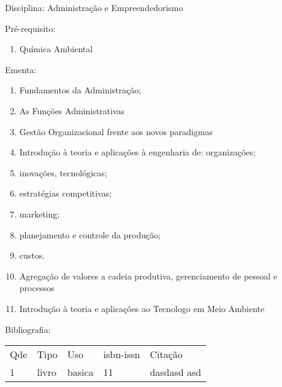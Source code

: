 \documentclass[12pt,a4paper,twoside]{report}
\begin{document}
Disciplina: Administração e Empreendedorismo

Pré-requisito:
\begin{enumerate}
\item Química Ambiental
\end{enumerate}

Ementa:
\begin{enumerate}
\item Fundamentos da Administração;
\item As Funções Administrativas
\item Gestão Organizacional frente aos novos paradigmas
\item Introdução à teoria e aplicações à engenharia de: organizações;
\item inovações, tecnológicas;
\item estratégias competitivas;
\item marketing;
\item planejamento e controle da produção;
\item custos.
\item Agregação de valores a cadeia produtiva, gerenciamento de pessoal e processos
\item Introdução à teoria e aplicações ao Tecnologo em Meio Ambiente
\end{enumerate}

Bibliografia:
\begin{tabular}{lllll}
Qde & Tipo & Uso & isbn-issn & Citação \\
1&livro&basica&11&dasdasd asd\\
\end{tabular}
\end{document}
